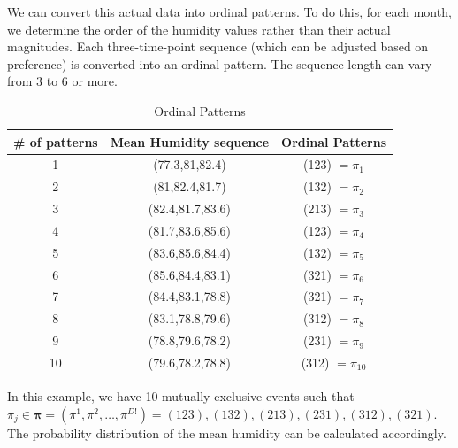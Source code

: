 We can convert this actual data into ordinal patterns. To do this, for each month, we determine the order of the humidity values rather than their actual magnitudes. Each three-time-point sequence (which can be adjusted based on preference) is converted into an ordinal pattern. 
The sequence length can vary from 3 to 6 or more.

\begin{table}[ht]
	\caption{Ordinal Patterns} %
	\centering %
	\begin{tabular}{c c	c } %
		\hline\hline %
		\# of patterns & Mean Humidity sequence & Ordinal Patterns \\ [0.5ex] %
		\hline %
		1 & (77.3,81,82.4) & (123) $=\pi_1$\\ 
		2 & (81,82.4,81.7) & (132) $=\pi_2$\\
		3 & (82.4,81.7,83.6) & (213) $=\pi_3$\\
		4 & (81.7,83.6,85.6) & (123) $=\pi_4$ \\
		5 & (83.6,85.6,84.4) & (132) $=\pi_5$\\ 
		6 & (85.6,84.4,83.1) & (321) $=\pi_6$\\
		7 & (84.4,83.1,78.8) & (321) $=\pi_7$\\
		8 & (83.1,78.8,79.6) & (312) $=\pi_8$\\ 
		9 & (78.8,79.6,78.2) & (231) $=\pi_9$\\
		10 & (79.6,78.2,78.8) & (312) $=\pi_{10}$\\ [1ex] %
		\hline %
	\end{tabular}
	\label{table:nonlin} %
\end{table}

In this example, we have 10 mutually exclusive events such that 
$\pi_j \in \mathbf{{\pi}}=({\pi}^1, {\pi}^2,\dots, {\pi}^{D!})= {(123),(132),(213),(231),(312),(321)}$. The probability distribution of the mean humidity can be calculated accordingly.

